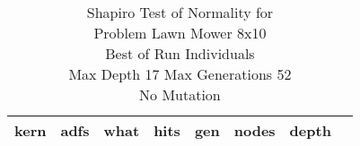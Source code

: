 \begin{table}[H]
\caption{Shapiro Test of Normality for \\ Problem  Lawn Mower 8x10\\Best of Run Individuals \\ Max Depth 17 Max Generations 52\\ No Mutation \\}
\begin{center}
\scalebox{0.8} %
{
\begin{tabular}{lrrrrrrr}
\hline
kern & adfs & what & hits & gen & nodes & depth \\
\hline


\end{tabular}
}
\end{center}
\end{table}

